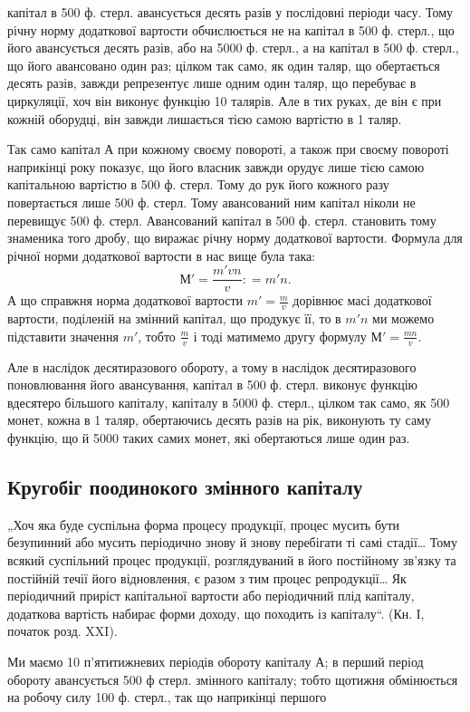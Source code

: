 \parcont{}  %
капітал в 500 ф. стерл. авансується десять разів у послідовні періоди часу.
Тому річну норму додаткової вартости обчислюється не на капітал в 500 ф.
стерл., що його авансується десять разів, або на 5000 ф. стерл., а на капітал
в 500 ф. стерл., що його авансовано один раз; цілком так само,
як один таляр, що обертається десять разів, завжди репрезентує лише
одним один таляр, що перебуває в циркуляції, хоч він виконує функцію
10 талярів. Але в тих руках, де він є при кожній оборудці, він завжди
лишається тією самою вартістю в 1 таляр.

Так само капітал $А$ при кожному своєму повороті, а також при своєму
повороті наприкінці року показує, що його власник завжди орудує
лише тією самою капітальною вартістю в 500 ф. стерл. Тому до рук його
кожного разу повертається лише 500 ф. стерл. Тому авансований ним капітал
ніколи не перевищує 500 ф. стерл. Авансований капітал в 500 ф. стерл.
становить тому знаменика того дробу, що виражає річну норму додаткової
вартости. Формула для річної норми додаткової вартости в нас
вище була така:\[
М' = \frac{m'vn}{v}: = m'n\text{.}
\]
А що справжня норма додаткової вартости $m' = \frac{m}{v}$ дорівнює масі додаткової
вартости, поділеній на змінний капітал, що продукує її, то в
$m'n$ ми можемо підставити значення $m'$, тобто $\frac{m}{v}$ і тоді матимемо другу
формулу $М' = \frac{mn}{v}$.

Але в наслідок десятиразового обороту, а тому в наслідок десятиразового
поновлювання його авансування, капітал в 500 ф. стерл. виконує
функцію вдесятеро більшого капіталу, капіталу в 5000 ф. стерл., цілком так
само, як 500 монет, кожна в 1 таляр, обертаючись десять разів на рік,
виконують ту саму функцію, що й 5000 таких самих монет, які обертаються
лише один раз.

\subsection{Кругобіг поодинокого змінного капіталу}

„Хоч яка буде суспільна форма процесу продукції, процес мусить
бути безупинний або мусить періодично знову й знову перебігати ті самі
стадії\dots{} Тому всякий суспільний процес продукції, розглядуваний в
його постійному зв’язку та постійній течії його відновлення, є разом з
тим процес репродукції\dots{} Як періодичний приріст капітальної вартости
або періодичний плід капіталу, додаткова вартість набирає форми доходу,
що походить із капіталу“. (Кн. І, початок розд. XXI).

Ми маємо 10 п’ятитижневих періодів обороту капіталу $А$; в перший
період обороту авансується 500 ф стерл. змінного капіталу; тобто щотижня
обмінюється на робочу силу 100 ф. стерл., так що наприкінці першого
\parbreak{}  %
